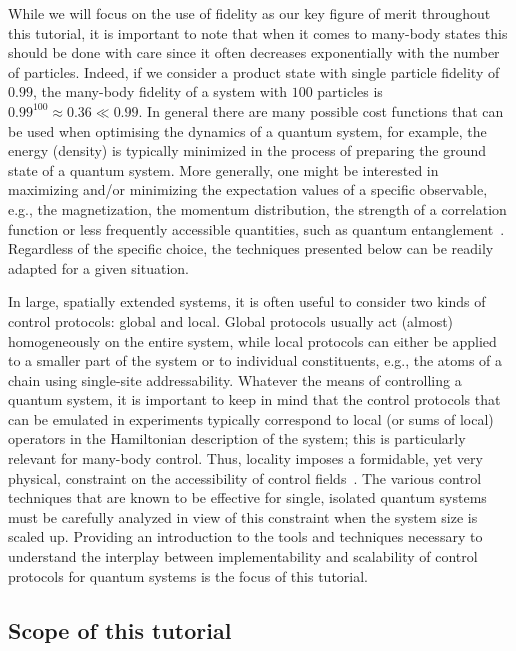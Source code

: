 While we will focus on the use of fidelity as our key figure of merit throughout this tutorial, it is important to note that when it comes to many-body states this should be done with care since it often decreases exponentially with the number of particles. Indeed, if we consider a product state with single particle fidelity of $0.99$, the many-body fidelity of a system with $100$ particles is $0.99^{100}\approx 0.36\ll 0.99$. In general there are many possible cost functions that can be used when optimising the dynamics of a quantum system, for example, the energy (density) is typically minimized in the process of preparing the ground state of a quantum system. More generally, one might be interested in maximizing and/or minimizing the expectation values of a specific observable, e.g., the magnetization, the momentum distribution, the strength of a correlation function or less frequently accessible quantities, such as quantum entanglement~\cite{kraus2001optimal,goerz2011,watts2015optimizing,tashev2024reinforcement}.  Regardless of the specific choice, the techniques presented below can be readily adapted for a given situation.

In large, spatially extended systems, it is often useful to consider two kinds of control protocols: global and local. Global protocols usually act (almost) homogeneously on the entire system, while local protocols can either be applied to a smaller part of the system or to individual constituents, e.g., the atoms of a chain using single-site addressability. Whatever the means of controlling a quantum system, it is important to keep in mind that the control protocols that can be emulated in experiments typically correspond to local (or sums of local) operators in the Hamiltonian description of the system; this is particularly relevant for many-body control. Thus, locality imposes a formidable, yet very physical, constraint on the accessibility of control fields~\cite{bukov2019geometric}. The various control techniques that are known to be effective for single, isolated quantum systems must be carefully analyzed in view of this constraint when the system size is scaled up. Providing an introduction to the tools and techniques necessary to understand the interplay between implementability and scalability of control protocols for quantum systems is the focus of this tutorial. 


\subsection{Scope of this tutorial}

